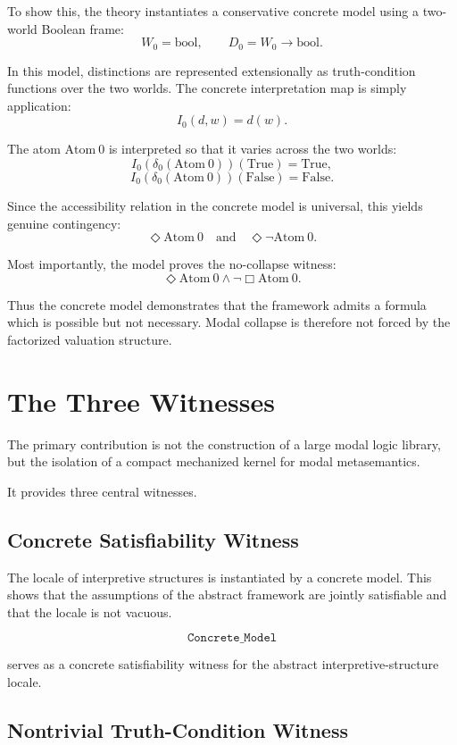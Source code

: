 \documentclass[11pt,a4paper]{article}
\begin{document}
To show this, the theory instantiates a conservative concrete model using a two-world Boolean frame:
\[
W_0 = \mathrm{bool},
\qquad
D_0 = W_0 \to \mathrm{bool}.
\]

In this model, distinctions are represented extensionally as truth-condition functions over the two worlds. The concrete interpretation map is simply application:
\[
I_0(d,w) = d(w).
\]

The atom $\mathrm{Atom}\ 0$ is interpreted so that it varies across the two worlds:
\[
I_0(\delta_0(\mathrm{Atom}\ 0))(\mathrm{True}) = \mathrm{True},
\]
\[
I_0(\delta_0(\mathrm{Atom}\ 0))(\mathrm{False}) = \mathrm{False}.
\]

Since the accessibility relation in the concrete model is universal, this yields genuine contingency:
\[
\Diamond \mathrm{Atom}\ 0
\quad\text{and}\quad
\Diamond \neg \mathrm{Atom}\ 0.
\]

Most importantly, the model proves the no-collapse witness:
\[
\Diamond \mathrm{Atom}\ 0 \wedge \neg \Box \mathrm{Atom}\ 0.
\]

Thus the concrete model demonstrates that the framework admits a formula which is possible but not necessary. Modal collapse is therefore not forced by the factorized valuation structure.

\section{The Three Witnesses}

The primary contribution is not the construction of a large modal logic library, but the isolation of a compact mechanized kernel for modal metasemantics.

It provides three central witnesses.

\subsection{Concrete Satisfiability Witness}

The locale of interpretive structures is instantiated by a concrete model. This shows that the assumptions of the abstract framework are jointly satisfiable and that the locale is not vacuous.

\[
\texttt{Concrete\_Model}
\]

serves as a concrete satisfiability witness for the abstract interpretive-structure locale.

\subsection{Nontrivial Truth-Condition Witness}
\end{document}
